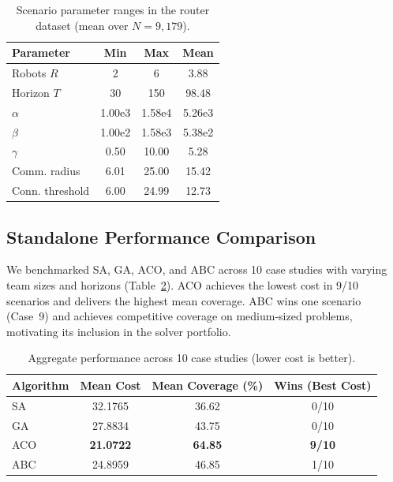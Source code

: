 \documentclass[conference]{IEEEtran}
\begin{document}
\begin{table}[t]
\centering
\caption{Scenario parameter ranges in the router dataset (mean over $N=9{,}179$).}
\label{tab:router_param_ranges}
{
\setlength{\tabcolsep}{10pt} %
\begin{tabular}{lccc}
\toprule
\textbf{Parameter} & \textbf{Min} & \textbf{Max} & \textbf{Mean} \\
\midrule
Robots $R$ & 2 & 6 & 3.88 \\
Horizon $T$ & 30 & 150 & 98.48 \\
$\alpha$ & 1.00e3 & 1.58e4 & 5.26e3 \\
$\beta$  & 1.00e2 & 1.58e3 & 5.38e2 \\
$\gamma$ & 0.50 & 10.00 & 5.28 \\
Comm. radius & 6.01 & 25.00 & 15.42 \\
Conn. threshold & 6.00 & 24.99 & 12.73 \\
\bottomrule
\end{tabular}
}
\end{table}


\subsection{Standalone Performance Comparison}
We benchmarked SA, GA, ACO, and ABC across 10 case studies with varying team sizes and horizons (Table~\ref{tab:case_study_summary}). ACO achieves the lowest cost in 9/10 scenarios and delivers the highest mean coverage. ABC wins one scenario (Case~9) and achieves competitive coverage on medium-sized problems, motivating its inclusion in the solver portfolio.

\begin{table}[t]
\centering
\caption{Aggregate performance across 10 case studies (lower cost is better).}
\label{tab:case_study_summary}
\begin{tabular}{@{}lccc@{}}
\toprule
\textbf{Algorithm} & \textbf{Mean Cost} & \textbf{Mean Coverage (\%)} & \textbf{Wins (Best Cost)} \\
\midrule
SA  & 32.1765 & 36.62 & 0/10 \\
GA  & 27.8834 & 43.75 & 0/10 \\
ACO & \textbf{21.0722} & \textbf{64.85} & \textbf{9/10} \\
ABC & 24.8959 & 46.85 & 1/10 \\
\bottomrule
\end{tabular}
\end{table}
\end{document}
